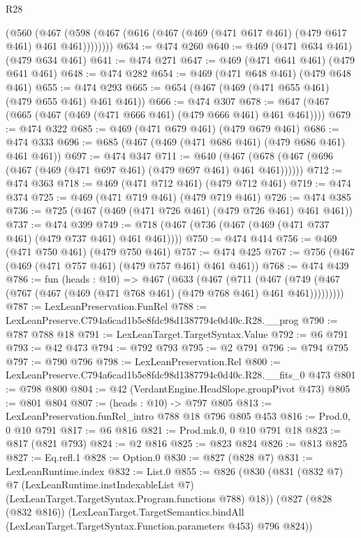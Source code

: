 \begin{lexlean}{R28}
\begin{coremodule}
      (@560 (@467 (@598 (@467 (@616 (@467 (@469 (@471 @617 @461) (@479 @617 @461) @461 @461))))))))
@634 := @474 @260
@640 := @469 (@471 @634 @461) (@479 @634 @461)
@641 := @474 @271
@647 := @469 (@471 @641 @461) (@479 @641 @461)
@648 := @474 @282
@654 := @469 (@471 @648 @461) (@479 @648 @461)
@655 := @474 @293
@665 := @654 (@467 (@469 (@471 @655 @461) (@479 @655 @461) @461 @461))
@666 := @474 @307
@678 := @647 (@467 (@665 (@467 (@469 (@471 @666 @461) (@479 @666 @461) @461 @461))))
@679 := @474 @322
@685 := @469 (@471 @679 @461) (@479 @679 @461)
@686 := @474 @333
@696 := @685 (@467 (@469 (@471 @686 @461) (@479 @686 @461) @461 @461))
@697 := @474 @347
@711 := @640 (@467 (@678 (@467 (@696 (@467 (@469 (@471 @697 @461) (@479 @697 @461) @461 @461))))))
@712 := @474 @363
@718 := @469 (@471 @712 @461) (@479 @712 @461)
@719 := @474 @374
@725 := @469 (@471 @719 @461) (@479 @719 @461)
@726 := @474 @385
@736 := @725 (@467 (@469 (@471 @726 @461) (@479 @726 @461) @461 @461))
@737 := @474 @399
@749 := @718 (@467 (@736 (@467 (@469 (@471 @737 @461) (@479 @737 @461) @461 @461))))
@750 := @474 @414
@756 := @469 (@471 @750 @461) (@479 @750 @461)
@757 := @474 @425
@767 := @756 (@467 (@469 (@471 @757 @461) (@479 @757 @461) @461 @461))
@768 := @474 @439
@786 := fun (heads : @10) =>
  @467
    (@633
      (@467
        (@711
          (@467 (@749 (@467 (@767 (@467 (@469 (@471 @768 @461) (@479 @768 @461) @461 @461)))))))))
@787 := LexLeanPreservation.FunRel
@788 := LexLeanPreserve.C794a6cad1b5e8fdc98d1387794c0d40c.R28.__prog
@790 := @787 @788 @18
@791 := LexLeanTarget.TargetSyntax.Value
@792 := @6 @791
@793 := @42 @473
@794 := @792 @793
@795 := @2 @791
@796 := @794 @795
@797 := @790 @796
@798 := LexLeanPreservation.Rel
@800 := LexLeanPreserve.C794a6cad1b5e8fdc98d1387794c0d40c.R28.__fits_0 @473
@801 := @798 @800
@804 := @42 (VerdantEngine.HeadSlope.groupPivot @473)
@805 := @801 @804
@807 := (heads : @10) -> @797 @805
@813 := LexLeanPreservation.funRel_intro @788 @18 @796 @805 @453
@816 := Prod.{0, 0} @10 @791
@817 := @6 @816
@821 := Prod.mk.{0, 0} @10 @791 @18
@823 := @817 (@821 @793)
@824 := @2 @816
@825 := @823 @824
@826 := @813 @825
@827 := Eq.refl.{1}
@828 := Option.{0}
@830 := @827 (@828 @7)
@831 := LexLeanRuntime.index
@832 := List.{0}
@855 := @826
    (@830
      (@831
        (@832 @7)
        @7
        (LexLeanRuntime.instIndexableList @7)
        (LexLeanTarget.TargetSyntax.Program.functions @788)
        @18))
    (@827
      (@828 (@832 @816))
      (LexLeanTarget.TargetSemantics.bindAll
        (LexLeanTarget.TargetSyntax.Function.parameters @453)
        @796
        @824))

\end{coremodule}
\end{lexlean}

